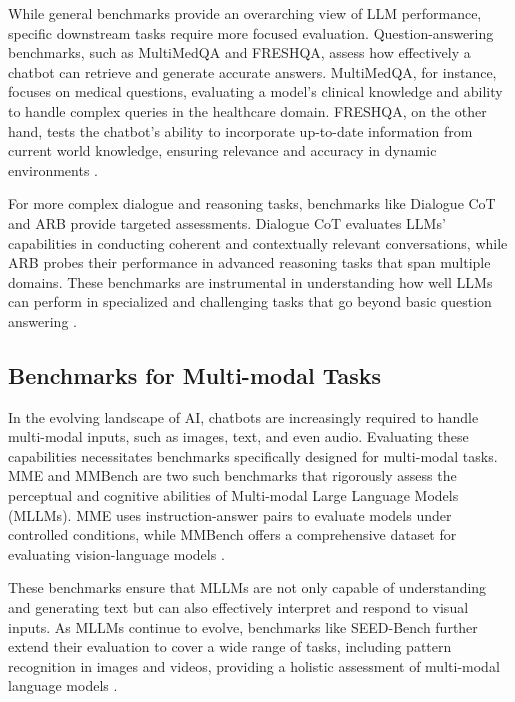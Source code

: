 While general benchmarks provide an overarching view of LLM performance, specific downstream tasks require more focused evaluation. Question-answering benchmarks, such as MultiMedQA and FRESHQA, assess how effectively a chatbot can retrieve and generate accurate answers. MultiMedQA, for instance, focuses on medical questions, evaluating a model's clinical knowledge and ability to handle complex queries in the healthcare domain. FRESHQA, on the other hand, tests the chatbot's ability to incorporate up-to-date information from current world knowledge, ensuring relevance and accuracy in dynamic environments \cite{singhal2022large, vu2023freshllms}.

For more complex dialogue and reasoning tasks, benchmarks like Dialogue CoT and ARB provide targeted assessments. Dialogue CoT evaluates LLMs' capabilities in conducting coherent and contextually relevant conversations, while ARB probes their performance in advanced reasoning tasks that span multiple domains. These benchmarks are instrumental in understanding how well LLMs can perform in specialized and challenging tasks that go beyond basic question answering \cite{wang2023cue, sawada2023arb}.

\subsection{Benchmarks for Multi-modal Tasks}

In the evolving landscape of AI, chatbots are increasingly required to handle multi-modal inputs, such as images, text, and even audio. Evaluating these capabilities necessitates benchmarks specifically designed for multi-modal tasks. MME and MMBench are two such benchmarks that rigorously assess the perceptual and cognitive abilities of Multi-modal Large Language Models (MLLMs). MME uses instruction-answer pairs to evaluate models under controlled conditions, while MMBench offers a comprehensive dataset for evaluating vision-language models \cite{yin2023survey, liu2023mmbench}.

These benchmarks ensure that MLLMs are not only capable of understanding and generating text but can also effectively interpret and respond to visual inputs. As MLLMs continue to evolve, benchmarks like SEED-Bench further extend their evaluation to cover a wide range of tasks, including pattern recognition in images and videos, providing a holistic assessment of multi-modal language models \cite{li2023seed}. \newline

